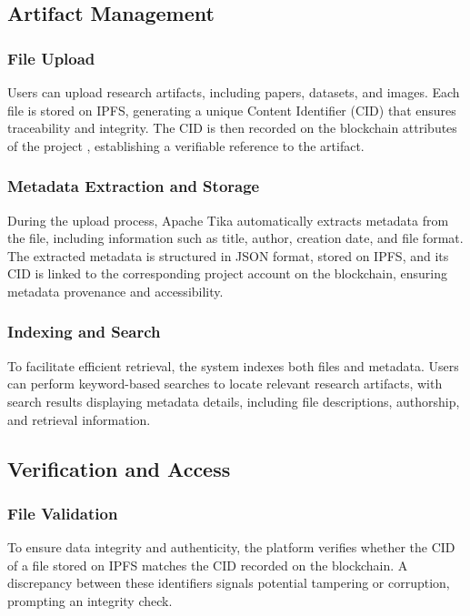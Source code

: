 \documentclass{article}
\begin{document}
\subsection{Artifact Management}

\subsubsection{File Upload}
Users can upload research artifacts, including papers, datasets, and images. Each file is stored on IPFS, generating a unique Content Identifier (CID) that ensures traceability and integrity. The CID is then recorded on the blockchain attributes of the project , establishing a verifiable reference to the artifact.

\subsubsection{Metadata Extraction and Storage}
During the upload process, Apache Tika automatically extracts metadata from the file, including information such as title, author, creation date, and file format. The extracted metadata is structured in JSON format, stored on IPFS, and its CID is linked to the corresponding project account on the blockchain, ensuring metadata provenance and accessibility.

\subsubsection{Indexing and Search}
To facilitate efficient retrieval, the system indexes both files and metadata. Users can perform keyword-based searches to locate relevant research artifacts, with search results displaying metadata details, including file descriptions, authorship, and retrieval information.

\subsection{Verification and Access}

\subsubsection{File Validation}
To ensure data integrity and authenticity, the platform verifies whether the CID of a file stored on IPFS matches the CID recorded on the blockchain. A discrepancy between these identifiers signals potential tampering or corruption, prompting an integrity check.
\end{document}
